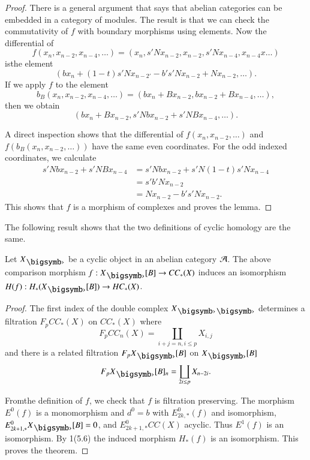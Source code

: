 \begin{proof}
There is a general argument that says that abelian categories can be
embedded in a category of modules. The result is that we can check the
commutativity of $f$ with boundary morphisms using elements. Now the
differential of 
$$
f(x_{n},x_{n-2},x_{n-4},\ldots)=(x_{n},s'Nx_{n-2},x_{n-2},s'Nx_{n-4},x_{n-4}x\ldots) 
$$
is\pageoriginale the element
$$
(bx_{n}+(1-t)s'Nx_{n-2'}-b's'Nx_{n-2}+Nx_{n-2},\ldots).
$$
If we apply $f$ to the element
$$
b_{B}(x_{n},x_{n-2},x_{n-4},\ldots)=(bx_{n}+Bx_{n-2},bx_{n-2}+Bx_{n-4},\ldots), 
$$
then we obtain
$$
(bx_{n}+Bx_{n-2},s'Nbx_{n-2}+s'NBx_{n-4},\ldots).
$$

A direct inspection shows that the differential of
$f(x_{n},x_{n-2},\ldots)$ and $f(b_{B}(x_{n},x_{n-2},\ldots))$ have
the same even coordinates. For the odd indexed coordinates, we
calculate
\begin{align*}
s'Nbx_{n-2}+s'NBx_{n-4} &= s'Nbx_{n-2}+s'N(1-t)s'Nx_{n-4}\\
&= s'b'Nx_{n-2}\\
&= Nx_{n-2}-b's'Nx_{n-2}.
\end{align*}
This shows that $f$ is a morphism of complexes and proves the lemma.
\end{proof}

The following result shows that the two definitions of cyclic homology
are the same.

\begin{theorem}\label{chap5-thm3.3}
Let $X_{\bigdot}$ be a cyclic object in an abelian category $\mathcal{A}$. The
above comparison morphism $f:X_{\bigdot}[B]\to CC_{\ast}(X)$ induces
an isomorphism $H(f):H_{\ast}(X_{\bigdot}[B])\to HC_{\ast}(X)$.
\end{theorem}

\begin{proof}
The first index of the double complex $X_{\bigdot\bigdot}$ determines
a filtration $F_{p}CC_{\ast}(X)$ on $CC_{\ast}(X)$ where
$$
F_{p}CC_{n}(X)=\coprod\limits_{i+j=n,i\leq p}X_{i,j}
$$
and there is a related filtration $F_{p}X_{\bigdot}[B]$ on
$X_{\bigdot}[B]$
$$
F_{p}X_{\bigdot}[B]_{n}=\coprod_{2i\leq p}X_{n-2i}. 
$$

From\pageoriginale the definition of $f$, we check that $f$ is
filtration preserving. The morphism $E^{0}(f)$ is a monomorphism and
$d^{0}=b$ with $E^{0}_{2k,\ast}(f)$ and isomorphism,
$E^{0}_{2k+1,\ast}X_{\bigdot}[B]=0$, and $E^{0}_{2k+1,\ast}CC(X)$
acyclic. Thus $E^{1}(f)$ is an isomorphism. By 1(5.6) the induced
morphism $H_{\ast}(f)$ is an isomorphism. This proves the theorem.
\end{proof}

